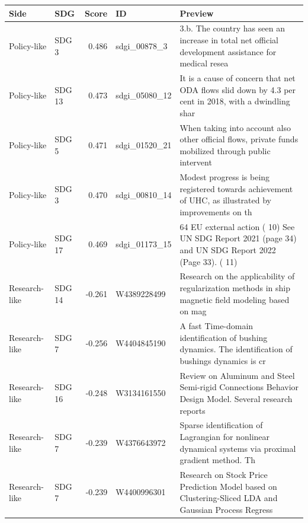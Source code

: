 \begin{tabular}{llrp{}p{}}
\toprule
Side & SDG & Score & ID & Preview \\
\midrule
Policy-like & SDG 3 & 0.486 & sdgi\_00878\_3 & 3.b. The country has seen an increase in total net official development assistance for medical resea \\
Policy-like & SDG 13 & 0.473 & sdgi\_05080\_12 & It is a cause of concern that net ODA flows slid down by 4.3 per cent in 2018, with a dwindling shar \\
Policy-like & SDG 5 & 0.471 & sdgi\_01520\_21 & When taking into account also other official flows, private funds mobilized through public intervent \\
Policy-like & SDG 3 & 0.470 & sdgi\_00810\_14 & Modest progress is being registered towards achievement of UHC, as illustrated by improvements on th \\
Policy-like & SDG 17 & 0.469 & sdgi\_01173\_15 & 64 EU external action ( 10) See UN SDG Report 2021 (page 34) and UN SDG Report 2022 (Page 33). ( 11) \\
\midrule
Research-like & SDG 14 & -0.261 & W4389228499 & Research on the applicability of regularization methods in ship magnetic field modeling based on mag \\
Research-like & SDG 7 & -0.256 & W4404845190 & A fast Time-domain identification of bushing dynamics. The identification of bushings dynamics is cr \\
Research-like & SDG 16 & -0.248 & W3134161550 & Review on Aluminum and Steel Semi-rigid Connections Behavior Design Model. Several research reports  \\
Research-like & SDG 7 & -0.239 & W4376643972 & Sparse identification of Lagrangian for nonlinear dynamical systems via proximal gradient method. Th \\
Research-like & SDG 7 & -0.239 & W4400996301 & Research on Stock Price Prediction Model based on Clustering-Sliced LDA and Gaussian Process Regress \\
\bottomrule
\end{tabular}
